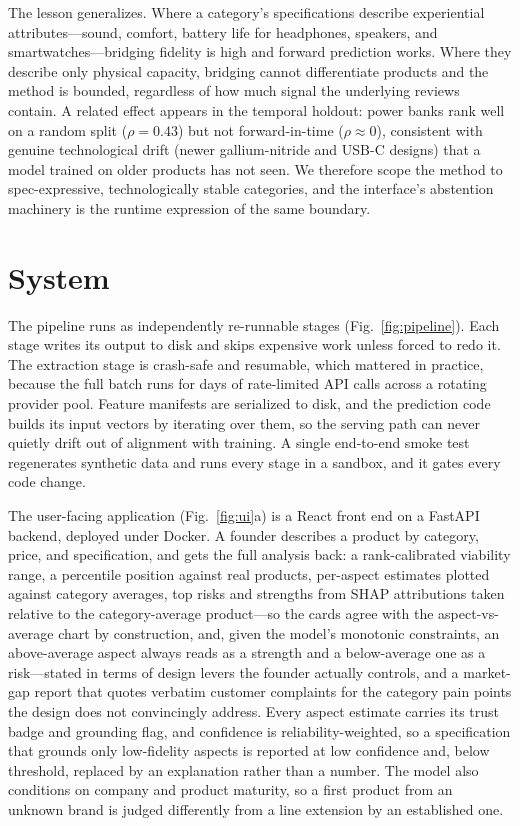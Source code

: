 \documentclass[journal]{IEEEtran}
\begin{document}
The lesson generalizes. Where a category's specifications describe experiential attributes---sound, comfort, battery life for headphones, speakers, and smartwatches---bridging fidelity is high and forward prediction works. Where they describe only physical capacity, bridging cannot differentiate products and the method is bounded, regardless of how much signal the underlying reviews contain. A related effect appears in the temporal holdout: power banks rank well on a random split ($\rho = 0.43$) but not forward-in-time ($\rho \approx 0$), consistent with genuine technological drift (newer gallium-nitride and USB-C designs) that a model trained on older products has not seen. We therefore scope the method to spec-expressive, technologically stable categories, and the interface's abstention machinery is the runtime expression of the same boundary.

\section{System}
\label{sec:system}
The pipeline runs as independently re-runnable stages (Fig.~\ref{fig:pipeline}). Each stage writes its output to disk and skips expensive work unless forced to redo it. The extraction stage is crash-safe and resumable, which mattered in practice, because the full batch runs for days of rate-limited API calls across a rotating provider pool. Feature manifests are serialized to disk, and the prediction code builds its input vectors by iterating over them, so the serving path can never quietly drift out of alignment with training. A single end-to-end smoke test regenerates synthetic data and runs every stage in a sandbox, and it gates every code change.

The user-facing application (Fig.~\ref{fig:ui}a) is a React front end on a FastAPI backend, deployed under Docker. A founder describes a product by category, price, and specification, and gets the full analysis back: a rank-calibrated viability range, a percentile position against real products, per-aspect estimates plotted against category averages, top risks and strengths from SHAP \cite{lundberg2017shap} attributions taken relative to the category-average product---so the cards agree with the aspect-vs-average chart by construction, and, given the model's monotonic constraints, an above-average aspect always reads as a strength and a below-average one as a risk---stated in terms of design levers the founder actually controls, and a market-gap report that quotes verbatim customer complaints for the category pain points the design does not convincingly address. Every aspect estimate carries its trust badge and grounding flag, and confidence is reliability-weighted, so a specification that grounds only low-fidelity aspects is reported at low confidence and, below threshold, replaced by an explanation rather than a number. The model also conditions on company and product maturity, so a first product from an unknown brand is judged differently from a line extension by an established one.
\end{document}
